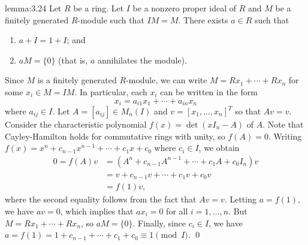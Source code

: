 \begin{lemma}[Nakayama]{lemma:3.24}
    Let $R$ be a ring. Let $I$ be a nonzero proper ideal of $R$ and $M$ 
    be a finitely generated $R$-module such that $IM = M$. There exists 
    $a \in R$ such that 
    \begin{enumerate}[(1)]
        \item $a + I = 1 + I$; and 
        \item $aM = \{0\}$ (that is, $a$ annihilates the module).
    \end{enumerate}
\end{lemma}\vspace{-0.25cm}
\begin{pf}
    Since $M$ is a finitely generated $R$-module, we can write 
    $M = Rx_1 + \cdots + Rx_n$ for some $x_i \in M = IM$. In particular, 
    each $x_i$ can be written in the form 
    \[ x_i = a_{i1} x_1 + \cdots + a_{in} x_n \] 
    where $a_{ij} \in I$. Let $A = [a_{ij}] \in M_n(I)$ and 
    $v = [x_1, \dots, x_n]^T$ so that $Av = v$. Consider the characteristic 
    polynomial $f(x) = \det(xI_n - A)$ of $A$.
    Note that Cayley-Hamilton holds for commutative rings with unity, so
    $f(A) = 0$. Writing $f(x) = x^n + c_{n-1} x^{n-1} + \cdots + c_1 x + c_0$ 
    where $c_i \in I$, we obtain 
    \begin{align*}
        0 = f(A)v &= (A^n + c_{n-1} A^{n-1} + \cdots + c_1 A + c_0 I_n) v \\ 
        &= v + c_{n-1}v + \cdots + c_1 v + c_0 v \\ 
        &= f(1) v,
    \end{align*}
    where the second equality follows from the fact that $Av = v$. 
    Letting $a = f(1)$, we have $av = 0$, which implies that 
    $ax_i = 0$ for all $i = 1, \dots, n$. But $M = Rx_1 + \cdots + Rx_n$,
    so $aM = \{0\}$. Finally, since $c_i \in I$, we have 
    $a = f(1) = 1 + c_{n-1} + \cdots + c_1 + c_0 \equiv 1 \pmod I$. \qed 
\end{pf}\vspace{-0.25cm}

